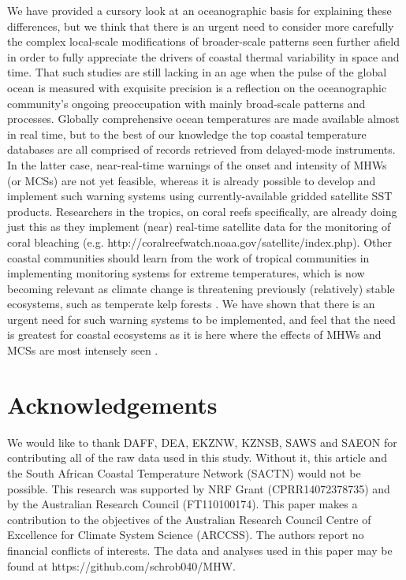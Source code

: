 \documentclass[a4paper,10pt,review]{elsarticle}
\begin{document}
We have provided a cursory look at an oceanographic basis for explaining these differences, but we think that there is an urgent need to consider more carefully the complex local-scale modifications of broader-scale patterns seen further afield in order to fully appreciate the drivers of coastal thermal variability in space and time. That such studies are still lacking in an age when the pulse of the global ocean is measured with exquisite precision is a reflection on the oceanographic community's ongoing preoccupation with mainly broad-scale patterns and processes. Globally comprehensive ocean temperatures are made available almost in real time, but to the best of our knowledge the top coastal temperature databases are all comprised of records retrieved from delayed-mode instruments. In the latter case, near-real-time warnings of the onset and intensity of MHWs (or MCSs) are not yet feasible, whereas it is already possible to develop and implement such warning systems using currently-available gridded satellite SST products. Researchers in the tropics, on coral reefs specifically, are already doing just this as they implement (near) real-time satellite data for the monitoring of coral bleaching (e.g. http://coralreefwatch.noaa.gov/satellite/index.php). Other coastal communities should learn from the work of tropical communities in implementing monitoring systems for extreme temperatures, which is now becoming relevant as climate change is threatening previously (relatively) stable ecosystems, such as temperate kelp forests \citep{Wernberg2013}. We have shown that there is an urgent need for such warning systems to be implemented, and feel that the need is greatest for coastal ecosystems as it is here where the effects of MHWs and MCSs are most intensely seen . 

\section*{Acknowledgements}
We would like to thank DAFF, DEA, EKZNW, KZNSB, SAWS and SAEON for contributing all of the raw data used in this study. Without it, this article and the South African Coastal Temperature Network (SACTN) would not be possible. This research was supported by NRF Grant (CPRR14072378735) and by the Australian Research Council (FT110100174). This paper makes a contribution to the objectives of the Australian Research Council Centre of Excellence for Climate System Science (ARCCSS). The authors report no financial conflicts of interests. The data and analyses used in this paper may be found at https://github.com/schrob040/MHW.
\end{document}
